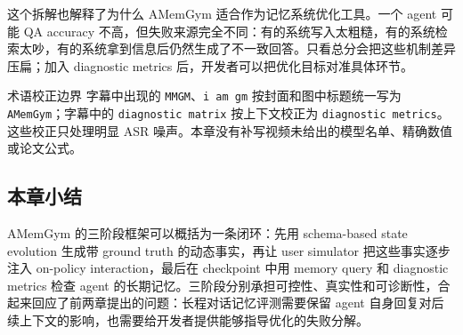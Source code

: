 这个拆解也解释了为什么 AMemGym 适合作为记忆系统优化工具。一个 agent 可能 QA accuracy 不高，但失败来源完全不同：有的系统写入太粗糙，有的系统检索太吵，有的系统拿到信息后仍然生成了不一致回答。只看总分会把这些机制差异压扁；加入 diagnostic metrics 后，开发者可以把优化目标对准具体环节。

\begin{warningbox}{术语校正边界}
字幕中出现的 \texttt{MMGM}、\texttt{i am gm} 按封面和图中标题统一写为 \texttt{AMemGym}；字幕中的 \texttt{diagnostic matrix} 按上下文校正为 \texttt{diagnostic metrics}。这些校正只处理明显 ASR 噪声。本章没有补写视频未给出的模型名单、精确数值或论文公式。
\end{warningbox}

\subsection{本章小结}

AMemGym 的三阶段框架可以概括为一条闭环：先用 schema-based state evolution 生成带 ground truth 的动态事实，再让 user simulator 把这些事实逐步注入 on-policy interaction，最后在 checkpoint 中用 memory query 和 diagnostic metrics 检查 agent 的长期记忆。三阶段分别承担可控性、真实性和可诊断性，合起来回应了前两章提出的问题：长程对话记忆评测需要保留 agent 自身回复对后续上下文的影响，也需要给开发者提供能够指导优化的失败分解。
